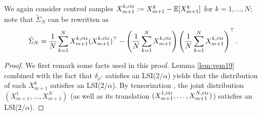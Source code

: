 \documentclass[12pt,reqno]{amsart}
\theoremstyle{remark}
\theoremstyle{definition}
\newcommand{\E}{\mathbb{E}}
\newcommand{\ctr}{\textnormal{ctr}}
\begin{document}
We again consider centred samples $X_{m+1}^{k,\ctr}:=X_{m+1}^{k}-\E[X_{m+1}^{k}]$ for $k=1,\ldots,N$; note that $\tilde{\Sigma}_{N}$ can be rewritten as
\begin{equation*}
    \tilde{\Sigma}_{N} = \frac{1}{N}\sum_{k=1}^{N}X_{m+1}^{k,\ctr}(X_{m+1}^{k,\ctr})^{\top} - \left(\frac{1}{N}\sum_{k=1}^{N}X_{m+1}^{k,\ctr}\right)\left(\frac{1}{N}\sum_{k=1}^{N}X_{m+1}^{k,\ctr}\right)^{\top}.
\end{equation*}

\begin{proof}
    We first remark some facts used in this proof.
    Lemma \ref{lem:vem19} combined with the fact that $\delta_{x^{\ast}}$ satisfies an LSI($2/\alpha$) yields that the distribution of each $X_{m+1}^{k}$ satisfies an LSI($2/\alpha$).
    By tensorization \citep{bakry2014analysis}, the joint distribution $(X_{m+1}^{1},\ldots,X_{m+1}^{N})$ (as well as its translation $(X_{m+1}^{1,\ctr},\ldots,X_{m+1}^{N,\ctr})$) satisfies an LSI($2/\alpha$).


\end{proof}
\end{document}
